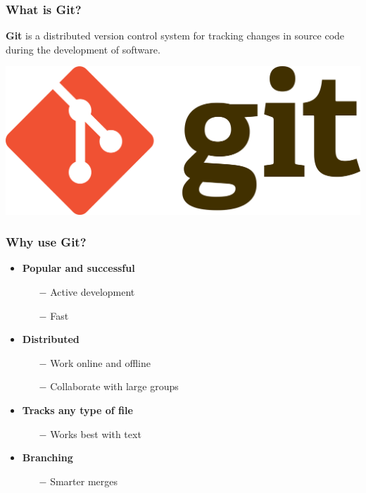\documentclass[svgnames]{beamer}
\begin{document}
\begin{frame}
    \frametitle{What is Git?}

    \textbf{Git} is a distributed version control system for tracking changes in source code during the development of software.

    \hfill \break

    \begin{center}
        \includegraphics[scale=0.07]{img/git_logo.png}
    \end{center}
\end{frame}


\begin{frame}
    \frametitle{Why use Git?}
    \begin{itemize}
        \item \textbf{Popular and successful}
            \begin{itemize}
                \item[$-$]{Active development}
                \item[$-$]{Fast}
                    \hfill \break
            \end{itemize}

        \item \textbf{Distributed}
            \begin{itemize}
                \item[$-$]{Work online and offline}
                \item[$-$]{Collaborate with large groups}
                    \hfill \break
            \end{itemize}

        \item \textbf{Tracks any type of file}
            \begin{itemize}
                \item[$-$]{Works best with text}
                    \hfill \break
            \end{itemize}

        \item \textbf{Branching}
            \begin{itemize}
                \item[$-$]{Smarter merges}
            \end{itemize}
    \end{itemize}
\end{frame}
\end{document}
